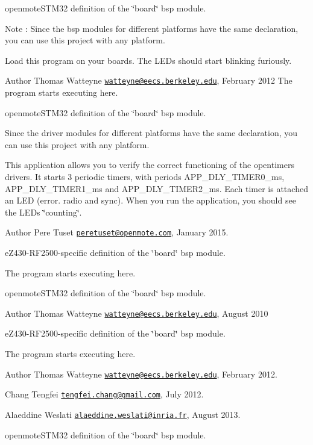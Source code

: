 openmote\+S\+T\+M32 definition of the \char`\"{}board\char`\"{} bsp module.

\begin{DoxyNote}{Note}
\+: Since the bsp modules for different platforms have the same declaration, you can use this project with any platform.
\end{DoxyNote}
Load this program on your boards. The L\+E\+Ds should start blinking furiously.

\begin{DoxyAuthor}{Author}
Thomas Watteyne \href{mailto:watteyne@eecs.berkeley.edu}{\tt watteyne@eecs.\+berkeley.\+edu}, February 2012 The program starts executing here.
\end{DoxyAuthor}
openmote\+S\+T\+M32 definition of the \char`\"{}board\char`\"{} bsp module.

Since the driver modules for different platforms have the same declaration, you can use this project with any platform.

This application allows you to verify the correct functioning of the opentimers drivers. It starts 3 periodic timers, with periods A\+P\+P\+\_\+\+D\+L\+Y\+\_\+\+T\+I\+M\+E\+R0\+\_\+ms, A\+P\+P\+\_\+\+D\+L\+Y\+\_\+\+T\+I\+M\+E\+R1\+\_\+ms and A\+P\+P\+\_\+\+D\+L\+Y\+\_\+\+T\+I\+M\+E\+R2\+\_\+ms. Each timer is attached an L\+ED (error. radio and sync). When you run the application, you should see the L\+E\+Ds \char`\"{}counting\char`\"{}.

\begin{DoxyAuthor}{Author}
Pere Tuset \href{mailto:peretuset@openmote.com}{\tt peretuset@openmote.\+com}, January 2015.
\end{DoxyAuthor}
e\+Z430-\/\+R\+F2500-\/specific definition of the \char`\"{}board\char`\"{} bsp module.

The program starts executing here.

openmote\+S\+T\+M32 definition of the \char`\"{}board\char`\"{} bsp module.

\begin{DoxyAuthor}{Author}
Thomas Watteyne \href{mailto:watteyne@eecs.berkeley.edu}{\tt watteyne@eecs.\+berkeley.\+edu}, August 2010
\end{DoxyAuthor}
e\+Z430-\/\+R\+F2500-\/specific definition of the \char`\"{}board\char`\"{} bsp module.

The program starts executing here.

\begin{DoxyAuthor}{Author}
Thomas Watteyne \href{mailto:watteyne@eecs.berkeley.edu}{\tt watteyne@eecs.\+berkeley.\+edu}, February 2012. 

Chang Tengfei \href{mailto:tengfei.chang@gmail.com}{\tt tengfei.\+chang@gmail.\+com}, July 2012. 

Alaeddine Weslati \href{mailto:alaeddine.weslati@inria.fr}{\tt alaeddine.\+weslati@inria.\+fr}, August 2013.
\end{DoxyAuthor}
openmote\+S\+T\+M32 definition of the \char`\"{}board\char`\"{} bsp module.


